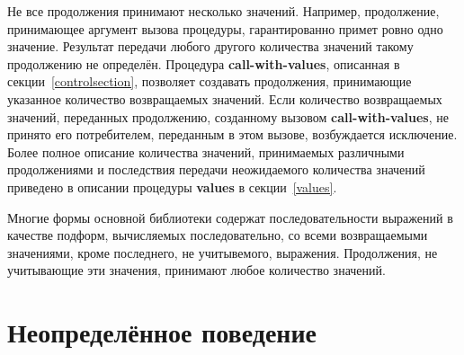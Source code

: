 Не все продолжения принимают несколько значений. Например, продолжение, принимающее аргумент
вызова процедуры, гарантированно примет ровно одно значение. Результат передачи любого другого
количества значений такому продолжению не определён. Процедура {\bfseries\cf call-with-values},
описанная в секции~\ref{controlsection}, позволяет создавать продолжения, принимающие указанное
количество возвращаемых значений. Если количество возвращаемых значений, переданных продолжению,
созданному вызовом {\bfseries\cf call-with-values}, не принято его потребителем, переданным в
этом вызове, возбуждается исключение. Более полное описание количества значений, принимаемых
различными продолжениями и последствия передачи неожидаемого количества значений приведено в
описании процедуры {\bfseries\cf values} в секции~\ref{values}.

Многие формы основной библиотеки содержат последовательности выражений в качестве подформ,
вычисляемых последовательно, со всеми возвращаемыми значениями, кроме последнего, не учитывемого,
выражения. Продолжения, не учитывающие эти значения, принимают любое количество значений.\vspace{-1.2mm}

\section{Неопределённое поведение}\vspace{-1.2mm}

